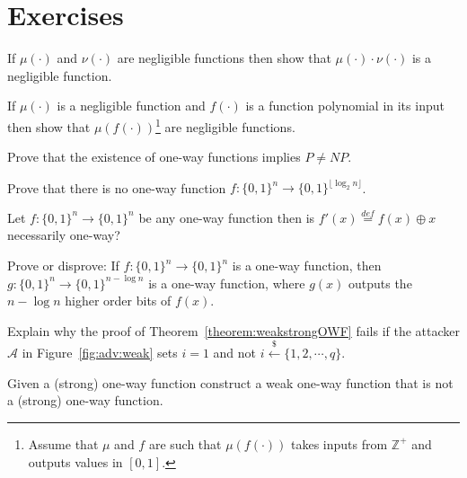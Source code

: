 \documentclass[12pt]{tufte-book}
\begin{document}
\section*{Exercises}
\begin{exercise}
\label{ex:product} If $\mu(\cdot)$ and $\nu(\cdot)$ are negligible functions then show that $\mu(\cdot) \cdot \nu(\cdot)$ is a negligible function.
\end{exercise}

\begin{exercise}
\label{ex:product} If $\mu(\cdot)$ is a negligible function and $f(\cdot)$ is a function polynomial in its input then show that $\mu(f(\cdot))$\footnote{Assume that $\mu$ and $f$ are such that $\mu(f(\cdot))$ takes inputs from $\mathbb{Z}^+$ and outputs values in $[0,1]$.} are negligible functions.
\end{exercise}

\begin{exercise}\label{ex:PNP} Prove that the existence of one-way functions implies $P \neq NP$.
\end{exercise}

\begin{exercise}
Prove that there is no one-way function $f:\{0,1\}^n\to \{0,1\}^{\lfloor \log_2 n\rfloor}$.
\end{exercise}


\begin{exercise} Let $f:\{0,1\}^n\to \{0,1\}^{n}$ be any one-way function then is $f'(x) \stackrel{def}{=} f(x)\oplus x$ necessarily one-way?
\end{exercise}

\begin{exercise}
Prove or disprove: If $f: \{0,1\}^n\rightarrow \{0,1\}^n$ is a one-way function, then $g: \{0,1\}^n\rightarrow \{0,1\}^{n-\log n}$ is a one-way function, where $g(x)$ outputs the $n-\log n$ higher order bits of $f(x)$.
\end{exercise}

\begin{exercise}
Explain why the proof of Theorem~\ref{theorem:weakstrongOWF} fails if the attacker $\mathcal{A}$ in Figure~\ref{fig:adv:weak} sets $i = 1$ and not $i \stackrel{\$}{\leftarrow} \{1, 2, \cdots, q\}$.
\end{exercise}

\begin{exercise}
Given a (strong) one-way function construct a weak one-way function that is not a (strong) one-way function.
\end{exercise}
\end{document}
